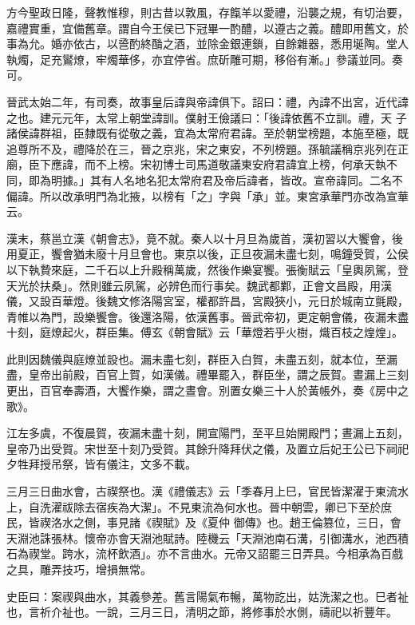 \begin{pinyinscope}
 方今聖政日隆，聲教惟穆，則古昔以敦風，存餼羊以愛禮，沿襲之規，有切治要，嘉禮實重，宜備舊章。謂自今王侯已下冠畢一酌醴，以遵古之義。醴即用舊文，於事為允。婚亦依古，以巹酌終酳之酒，並除金銀連鎖，自餘雜器，悉用埏陶。堂人執燭，足充鸑燎，牢燭華侈，亦宜停省。庶斫雕可期，移俗有漸。」參議並同。奏可。



 晉武太始二年，有司奏，故事皇后諱與帝諱俱下。詔曰：禮，內諱不出宮，近代諱之也。建元元年，太常上朝堂諱訓。僕射王儉議曰：「後諱依舊不立訓。禮，天
 子諸侯諱群祖，臣隸既有從敬之義，宜為太常府君諱。至於朝堂榜題，本施至極，既追尊所不及，禮降於在三，晉之京兆，宋之東安，不列榜題。孫毓議稱京兆列在正廟，臣下應諱，而不上榜。宋初博士司馬道敬議東安府君諱宜上榜，何承天執不同，即為明據。」其有人名地名犯太常府君及帝后諱者，皆改。宣帝諱同。二名不偏諱。所以改承明門為北掖，以榜有「之」字與「承」並。東宮承華門亦改為宣華云。



 漢末，蔡邕立漢《朝會志》，竟不就。秦人以十月旦為歲首，漢初習以大饗會，後用夏正，饗會猶未廢十月旦會也。東京以後，正旦夜漏未盡七刻，鳴鐘受賀，公侯以下執贄來庭，二千石以上升殿稱萬歲，然後作樂宴饗。張衡賦云「皇輿夙駕，登天光於扶桑」。然則雖云夙駕，必辨色而行事矣。魏武都鄴，正會文昌殿，用漢儀，又設百華燈。後魏文修洛陽宮室，權都許昌，宮殿狹小，元日於城南立氈殿，
 青帷以為門，設樂饗會。後還洛陽，依漢舊事。晉武帝初，更定朝會儀，夜漏未盡十刻，庭燎起火，群臣集。傅玄《朝會賦》云「華燈若乎火樹，熾百枝之煌煌」。



 此則因魏儀與庭燎並設也。漏未盡七刻，群臣入白賀，未盡五刻，就本位，至漏盡，皇帝出前殿，百官上賀，如漢儀。禮畢罷入，群臣坐，謂之辰賀。晝漏上三刻更出，百官奉壽酒，大饗作樂，謂之晝會。別置女樂三十人於黃帳外，奏《房中之歌》。



 江左多虞，不復晨賀，夜漏未盡十刻，開宣陽門，至平旦始開殿門；晝漏上五刻，皇帝乃出受賀。宋世至十刻乃受賀。其餘升降拜伏之儀，及置立后妃王公已下祠祀夕牲拜授吊祭，皆有儀注，文多不載。



 三月三日曲水會，古禊祭也。漢《禮儀志》云「季春月上巳，官民皆潔濯于東流水上，自洗濯祓除去宿疾為大潔」。不見東流為何水也。晉中朝雲，卿已下至於庶民，皆禊洛水之側，事見諸《禊賦》及《夏仲
 御傳》也。趙王倫篡位，三日，會天淵池誅張林。懷帝亦會天淵池賦詩。陸機云「天淵池南石溝，引御溝水，池西積石為禊堂。跨水，流杯飲酒」。亦不言曲水。元帝又詔罷三日弄具。今相承為百戲之具，雕弄技巧，增損無常。



 史臣曰：案禊與曲水，其義參差。舊言陽氣布暢，萬物訖出，姑洗潔之也。巳者祉也，言祈介祉也。一說，三月三日，清明之節，將修事於水側，禱祀以祈豐年。




\end{pinyinscope}
